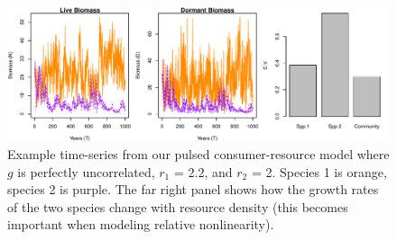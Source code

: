 \documentclass[12pt]{article}
\begin{document}
\begin{figure}
\begin{center}
\includegraphics{Fig-001}
\end{center}
\caption{Example time-series from our pulsed consumer-resource model where $g$ is perfectly uncorrelated, $r_1$ = 2.2, and $r_2$ = 2. Species 1 is orange, species 2 is purple. The far right panel shows how the growth rates of the two species change with resource density (this becomes important when modeling relative nonlinearity).}
\end{figure}
\end{document}
